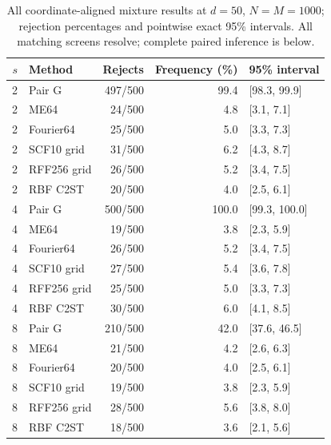 \begin{table}[t]\centering\scriptsize
\caption{All coordinate-aligned mixture results at $d=50$, $N=M=1000$; rejection percentages and pointwise exact 95\% intervals. All matching screens resolve; complete paired inference is below.}
\label{tab:axis-power-d50}
{\setlength{\tabcolsep}{8pt}\renewcommand{\arraystretch}{1.2}
\begin{tabular}{rlrrl}
\toprule
$s$ & Method & Rejects & Frequency (\%) & 95\% interval\\
\midrule
2 & Pair G & 497/500 & 99.4 & [98.3, 99.9]\\
2 & ME64 & 24/500 & 4.8 & [3.1, 7.1]\\
2 & Fourier64 & 25/500 & 5.0 & [3.3, 7.3]\\
2 & SCF10 grid & 31/500 & 6.2 & [4.3, 8.7]\\
2 & RFF256 grid & 26/500 & 5.2 & [3.4, 7.5]\\
2 & RBF C2ST & 20/500 & 4.0 & [2.5, 6.1]\\
4 & Pair G & 500/500 & 100.0 & [99.3, 100.0]\\
4 & ME64 & 19/500 & 3.8 & [2.3, 5.9]\\
4 & Fourier64 & 26/500 & 5.2 & [3.4, 7.5]\\
4 & SCF10 grid & 27/500 & 5.4 & [3.6, 7.8]\\
4 & RFF256 grid & 25/500 & 5.0 & [3.3, 7.3]\\
4 & RBF C2ST & 30/500 & 6.0 & [4.1, 8.5]\\
8 & Pair G & 210/500 & 42.0 & [37.6, 46.5]\\
8 & ME64 & 21/500 & 4.2 & [2.6, 6.3]\\
8 & Fourier64 & 20/500 & 4.0 & [2.5, 6.1]\\
8 & SCF10 grid & 19/500 & 3.8 & [2.3, 5.9]\\
8 & RFF256 grid & 28/500 & 5.6 & [3.8, 8.0]\\
8 & RBF C2ST & 18/500 & 3.6 & [2.1, 5.6]\\
\bottomrule
\end{tabular}}
\end{table}

